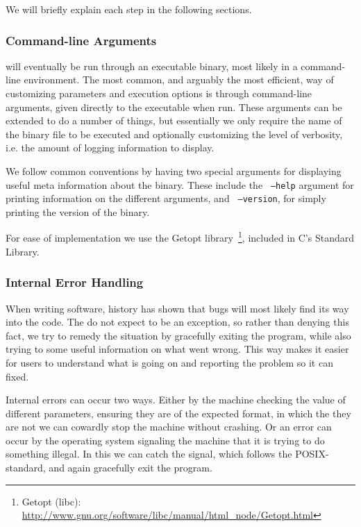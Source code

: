 We will briefly explain each step in the following sections.

\subsubsection{Command-line Arguments}
\thename{} will eventually be run through an executable binary, most likely in a
command-line environment. The most common, and arguably the most efficient, way
of customizing parameters and execution options is through command-line
arguments, given directly to the executable when run. These arguments can be
extended to do a number of things, but essentially we only require the name of
the binary file to be executed and optionally customizing the level of
verbosity, i.e. the amount of logging information to display.

We follow common conventions by having two special arguments for displaying
useful meta information about the \thename{} binary. These include the {\tt
  --help} argument for printing information on the different arguments, and {\tt
  --version}, for simply printing the version of the binary.

For ease of implementation we use the Getopt library~\footnote{Getopt (libc):
  \url{http://www.gnu.org/software/libc/manual/html_node/Getopt.html}}, included
in C's Standard Library.


\subsubsection{Internal Error Handling}

When writing software, history has shown that bugs will most likely find its way
into the code. The do not expect \thename{} to be an exception, so rather than
denying this fact, we try to remedy the situation by gracefully exiting the
program, while also trying to some useful information on what went wrong. This
way makes it easier for users to understand what is going on and reporting the
problem so it can fixed.

Internal errors can occur two ways. Either by the machine checking the value of
different parameters, ensuring they are of the expected format, in which the
they are not we can cowardly stop the machine without crashing. Or an error can
occur by the operating system signaling the machine that it is trying to do
something illegal. In this we can catch the signal, which follows the
POSIX-standard, and again gracefully exit the program.

